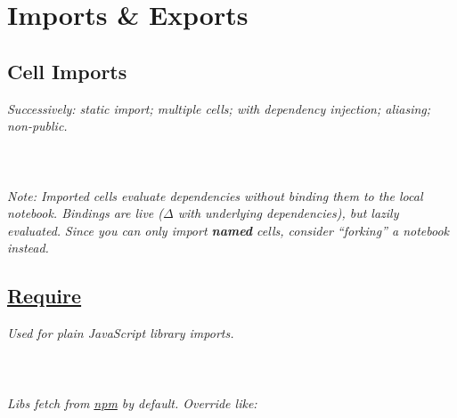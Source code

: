 \section{Imports \& Exports}


\subsection*{Cell Imports}
\textit{Successively: static import; multiple cells; with dependency injection; aliasing; non-public.}\\
\\
\\
\\


\textit{Note: Imported cells evaluate dependencies without binding them to the local notebook. Bindings are live ($\Delta$ with underlying dependencies), but lazily evaluated.}
\textit{Since you can only import \textbf{named} cells, consider ``forking'' a notebook instead.}\\


\subsection*{\href{https://observablehq.com/@observablehq/introduction-to-require}{Require}}
\textit{Used for plain JavaScript library imports.}\\
\\
\\
\\

\textit{Libs fetch from \href{https://www.npmjs.com/}{npm} by default. Override like:}\\
\\
\\

